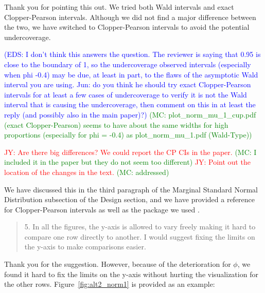 \documentclass[12pt]{article}
\newcommand{\jy}[1]{\textcolor{red}{JY: #1}}
\newcommand{\eds}[1]{\textcolor{blue}{(EDS: #1)}}
\newcommand{\mc}[1]{\textcolor{green}{(MC: #1)}}
\newenvironment{comment}%
{\begin{quotation}\noindent\small\it\color{darkblue}\ignorespaces%
}{\end{quotation}}
\begin{document}
Thank you for pointing this out. We tried both Wald intervals and exact 
Clopper-Pearson intervals. Although we did not find a major difference between
the two, we have switched to Clopper-Pearson intervals to avoid the potential
undercoverage.

\eds{I don't think this answers the question.  The reviewer is saying that 0.95 
is close to the boundary of 1, so the undercoverage observed intervals
(especially when phi -0.4) may be due, at least in part, to the flaws 
of the asymptotic Wald interval you are using. 
\@ Jun: do you think he should try exact Clopper-Pearson
intervals for at least a few cases of undercoverage to verify it is not the Wald
interval that is causing the undercoverage, then comment on this in at least the
reply (and possibly also in the main paper)?}
\mc{plot\_norm\_mu\_1\_cup.pdf (exact Clopper-Pearson) seems to have about the same 
widths for high 
proportions
(especially for phi = -0.4) as {plot\_norm\_mu\_1.pdf} (Wald-Type)}

\jy{Are there big differences? We could report the CP CIs in the paper.}
\mc{I included it in the paper but they do not seem too different}
\jy{Point out the location of the changes in the text.}
\mc{addressed}
  
We have discussed this in the third paragraph of the Marginal Standard Normal 
Distribution subsection of the Design section, and we have provided a reference
for Clopper-Pearson intervals \citep{clopper1934use} as well as the package we 
used \citep{PropCIs}.


\begin{comment}
5.  In all the figures, the y-axis is allowed to vary freely making it hard to 
compare one row directly to another.  I would suggest fixing the limits on the 
y-axis to make comparisons easier.  
\end{comment}

Thank you for the suggestion. However, because of the deterioration for $\phi$, 
we found it hard to fix the limits on the 
y-axis without hurting the visualization for the other rows. 
Figure~\ref{fig:alt2_norm1} is provided as an example:
\end{document}
